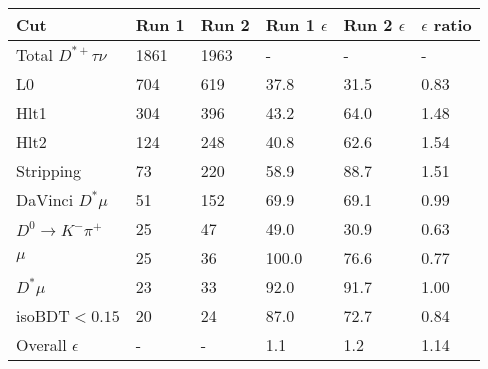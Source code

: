 \begin{tabular}{llllll}
\toprule
 Cut                       & Run 1   & Run 2   & Run 1 $\epsilon$   & Run 2 $\epsilon$   & $\epsilon$ ratio   \\
\midrule
 Total $D^{*+}\tau\nu$     & 1861    & 1963    & -                  & -                  & -                  \\
 L0                        & 704     & 619     & 37.8               & 31.5               & 0.83               \\
 Hlt1                      & 304     & 396     & 43.2               & 64.0               & 1.48               \\
 Hlt2                      & 124     & 248     & 40.8               & 62.6               & 1.54               \\
 Stripping                 & 73      & 220     & 58.9               & 88.7               & 1.51               \\
 DaVinci $D^* \mu$         & 51      & 152     & 69.9               & 69.1               & 0.99               \\
 $D^0\rightarrow K^-\pi^+$ & 25      & 47      & 49.0               & 30.9               & 0.63               \\
 $\mu$                     & 25      & 36      & 100.0              & 76.6               & 0.77               \\
 $D^* \mu$                 & 23      & 33      & 92.0               & 91.7               & 1.00               \\
 isoBDT$ < 0.15$           & 20      & 24      & 87.0               & 72.7               & 0.84               \\
 Overall $\epsilon$        & -       & -       & 1.1                & 1.2                & 1.14               \\
\bottomrule
\end{tabular}
